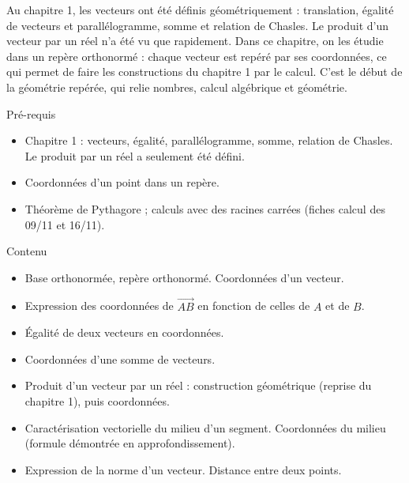 \documentclass{article}
\theoremstyle{definition}
\begin{document}
\pagestyle{fancy}

\fancyhf{} %
\fancyhead[L]{\large \textbf{\Niveau}}
\fancyhead[C]{\large \textbf{\Chapitre}}

\large

Au chapitre 1, les vecteurs ont été définis géométriquement : translation, égalité de vecteurs et parallélogramme, somme et relation de Chasles. Le produit d'un vecteur par un réel n'a été vu que rapidement. Dans ce chapitre, on les étudie dans un repère orthonormé : chaque vecteur est repéré par ses coordonnées, ce qui permet de faire les constructions du chapitre 1 par le calcul. C'est le début de la géométrie repérée, qui relie nombres, calcul algébrique et géométrie.

\begin{paragraph}{Pré-requis}
  \begin{itemize}
    \item Chapitre 1 : vecteurs, égalité, parallélogramme, somme, relation de Chasles. Le produit par un réel a seulement été défini.
    \item Coordonnées d'un point dans un repère.
    \item Théorème de Pythagore ; calculs avec des racines carrées (fiches calcul des 09/11 et 16/11).
  \end{itemize}
\end{paragraph}

\begin{paragraph}{Contenu}
    \begin{itemize}
        \item Base orthonormée, repère orthonormé. Coordonnées d'un vecteur.
        \item Expression des coordonnées de $\overrightarrow{AB}$ en fonction de celles de $A$ et de $B$.
        \item Égalité de deux vecteurs en coordonnées.
        \item Coordonnées d'une somme de vecteurs.
        \item Produit d'un vecteur par un réel : construction géométrique (reprise du chapitre 1), puis coordonnées.
        \item Caractérisation vectorielle du milieu d'un segment. Coordonnées du milieu (formule démontrée en approfondissement).
        \item Expression de la norme d'un vecteur. Distance entre deux points.
    \end{itemize}
\end{paragraph}
\end{document}
